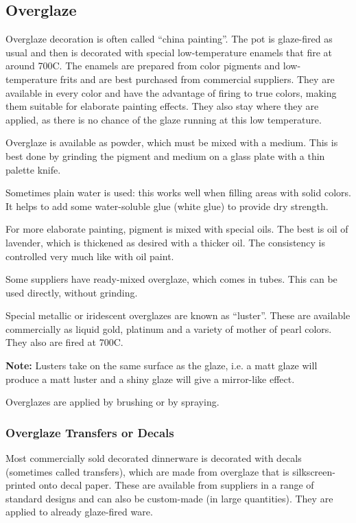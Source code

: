 \subsection{Overglaze}
Overglaze decoration is often called ``china painting''. The pot is glaze-fired 
as usual and then is decorated with special low-temperature enamels that fire 
at around 700\degree C. The enamels are prepared from color pigments and 
low-temperature frits and are best purchased from commercial suppliers. They 
are available in every color and have the advantage of firing to true colors, 
making them suitable for elaborate painting effects. They also stay where they 
are applied, as there is no chance of the glaze running at this low temperature.

Overglaze is available as powder, which must be mixed with a medium. This is 
best done by grinding the pigment and medium on a glass plate with a thin 
palette knife.

Sometimes plain water is used: this works well when filling areas with solid 
colors. It helps to add some water-soluble glue (white glue) to provide dry 
strength.

For more elaborate painting, pigment is mixed with special oils. The best is 
oil of lavender, which is thickened as desired with a thicker oil. The 
consistency is controlled very much like with oil paint.

Some suppliers have ready-mixed overglaze, which comes in tubes. This can be 
used directly, without grinding.

Special metallic or iridescent overglazes are known as ``luster''. These are 
available commercially as liquid gold, platinum and a variety of mother of 
pearl colors. They also are fired at 700\degree C. 

\textbf{Note:} Lusters take on the same surface as the glaze, i.e. a matt glaze 
will produce a matt luster and a shiny glaze will give a mirror-like effect.

Overglazes are applied by brushing or by spraying.
\subsubsection{Overglaze Transfers or Decals}
Most commercially sold decorated dinnerware is decorated with decals (sometimes 
called transfers), which are made from overglaze that is silkscreen-printed 
onto decal paper. These are available from suppliers in a range of standard 
designs and can also be custom-made (in large quantities). They are applied to 
already glaze-fired ware.

